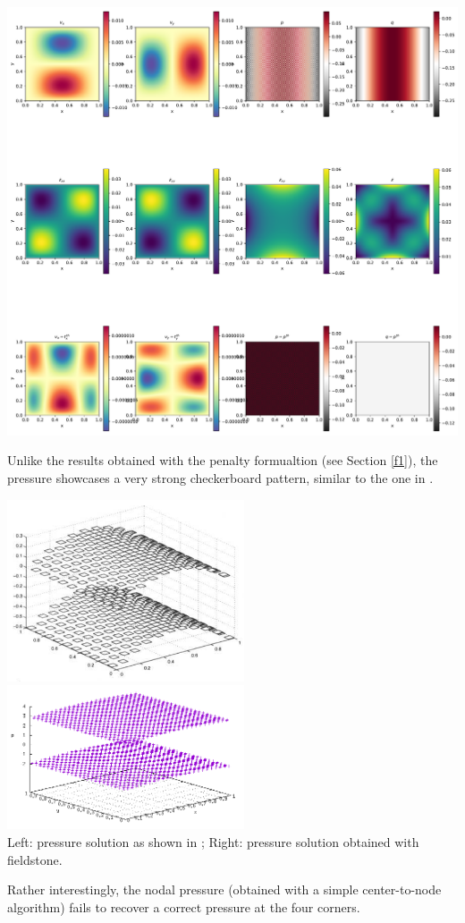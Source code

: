 \includegraphics[width=16cm]{python_codes/fieldstone_14/solution.pdf}

Unlike the results obtained with the penalty formualtion (see Section \ref{f1}),
the pressure showcases a very strong checkerboard pattern, similar to the one 
in \cite{dohu05}.

\begin{center}
\includegraphics[width=7cm]{python_codes/fieldstone_14/doneahuerta}
\includegraphics[width=7cm]{python_codes/fieldstone_14/mine}\\
Left: pressure solution as shown in \cite{dohu05}; Right: pressure solution obtained
with fieldstone.
\end{center}

Rather interestingly, the nodal pressure (obtained with a simple center-to-node algorithm)
fails to recover a correct pressure at the four corners.
